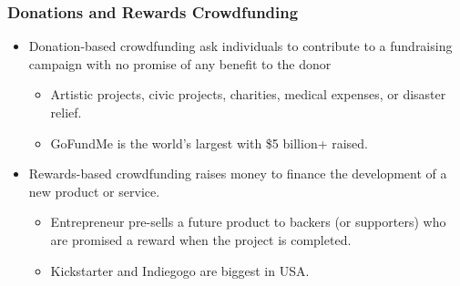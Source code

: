 \documentclass[aspectratio=169,xcolor=dvipsnames]{beamer}
\begin{document}
\begin{frame}
\frametitle{Donations and Rewards Crowdfunding}


\begin{itemize}
    \item Donation-based crowdfunding ask individuals to contribute to a fundraising campaign with no promise of any benefit to the donor
    \begin{itemize}
        \item Artistic projects, civic projects, charities, medical expenses, or disaster relief.
        \smallskip 
        \item GoFundMe is the world's largest with \$5 billion+ raised.
    \end{itemize}
    \medskip 
    \item Rewards-based crowdfunding raises money to finance the development of a new product or service. 
    \begin{itemize}
        \item Entrepreneur pre-sells a future product to backers (or supporters) who are promised a reward when the project is completed.
        \smallskip
        \item Kickstarter and Indiegogo are biggest in USA.
    \end{itemize}
\end{itemize}



\end{frame} 





\end{document}
